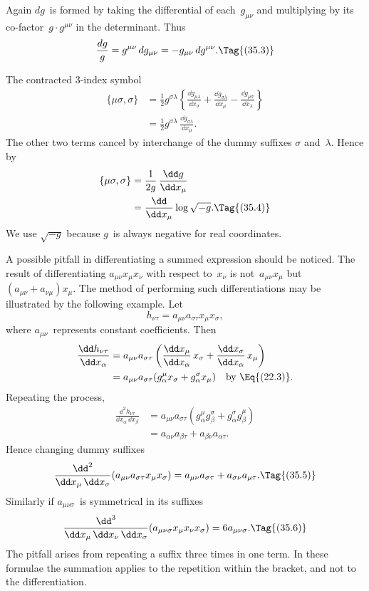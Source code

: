 \documentclass[12pt]{book}
\begin{document}
Again $dg$~is formed by taking the differential of each~$g_{\mu\nu}$ and multiplying
by its co\hyp{}factor~$g \cdot g^{\mu\nu}$ in the determinant. Thus
\[
\frac{dg}{g} = g^{\mu\nu}\, dg_{\mu\nu} = -g_{\mu\nu}\, dg^{\mu\nu}.
\Tag{(35.3)}
\]

The contracted $3$-index symbol
%
\begin{align*}
  \{\mu\sigma, \sigma\}
  &= \tfrac{1}{2} g^{\sigma\lambda} \left\{
    \frac{\dd g_{\mu\lambda}}{\dd x_{\sigma}}
  + \frac{\dd g_{\sigma\lambda}}{\dd x_{\mu}}
  - \frac{\dd g_{\mu\sigma}}{\dd x_{\lambda}}\right\} \\
  &= \tfrac{1}{2} g^{\sigma\lambda}\, \frac{\dd g_{\sigma\lambda}}{\dd x_{\mu}}.
\end{align*}
The other two terms cancel by interchange of the dummy suffixes $\sigma$ and~$\lambda$.
Hence by~
\begin{align*}
  \{\mu\sigma, \sigma\}
  &= \frac{1}{2g}\, \frac{\dd g}{\dd x_{\mu}} \\
  &= \frac{\dd}{\dd x_{\mu}} \log \sqrt{-g}.
  \Tag{(35.4)}
\end{align*}
We use $\sqrt{-g}$ because $g$~is always negative for real coordinates.

A possible pitfall in differentiating a summed expression should be noticed.
The result of differentiating $a_{\mu\nu} x_{\mu} x_{\nu}$ with respect to~$x_{\nu}$ is not~$a_{\mu\nu} x_{\mu}$ but
$(a_{\mu\nu} + a_{\nu\mu}) x_{\mu}$. The method of performing such differentiations may be illustrated
by the following example. Let
\[
h_{\nu\tau} = a_{\mu\nu} a_{\sigma\tau} x_{\mu} x_{\sigma},
\]
where $a_{\mu\nu}$~represents constant coefficients. Then
\begin{align*}
  \frac{\dd h_{\nu\tau}}{\dd x_{\alpha}}
  &= a_{\mu\nu} a_{\sigma\tau} \left(\frac{\dd x_{\mu}}{\dd x_{\alpha}}\, x_{\sigma} + \frac{\dd x_{\sigma}}{\dd x_{\alpha}}\, x_{\mu}\right) \\
  &= a_{\mu\nu} a_{\sigma\tau} (g_{\alpha}^{\mu} x_{\sigma} + g_{\alpha}^{\sigma} x_{\mu})
  \quad\text{by \Eq{(22.3)}.}
\end{align*}
%
Repeating the process,
\begin{align*}
  \frac{\dd^{2} h_{\nu\tau}}{\dd x_{\alpha}\, \dd x_{\beta}}
  &= a_{\mu\nu} a_{\sigma\tau} (g_{\alpha}^{\mu} g_{\beta}^{\sigma} + g_{\alpha}^{\sigma} g_{\beta}^{\mu}) \\
  &= a_{\alpha\nu} a_{\beta\tau} + a_{\beta\nu} a_{\alpha\tau}.
\end{align*}
Hence changing dummy suffixes
\[
\frac{\dd^{2}}{\dd x_{\mu}\, \dd x_{\sigma}} (a_{\mu\nu} a_{\sigma\tau} x_{\mu} x_{\sigma})
= a_{\mu\nu} a_{\sigma\tau} + a_{\sigma\nu} a_{\mu\tau}.
\Tag{(35.5)}
\]
Similarly if $a_{\mu\nu\sigma}$~is symmetrical in its suffixes
\[
\frac{\dd^{3}}{\dd x_{\mu}\, \dd x_{\nu}\, \dd x_{\sigma}} (a_{\mu\nu\sigma} x_{\mu} x_{\nu} x_{\sigma})
= 6a_{\mu\nu\sigma}.
\Tag{(35.6)}
\]
The pitfall arises from repeating a suffix three times in one term. In these
formulae the summation applies to the repetition within the bracket, and not
to the differentiation.
\end{document}
